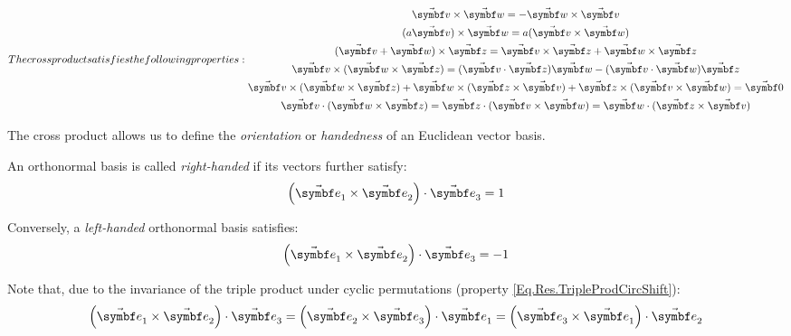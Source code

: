 \begin{subequations}
The cross product satisfies the following properties:
\begin{gather}
\vabs{v} \times \vabs{w} = -\vabs{w} \times \vabs{v} \label{Eq.Res.CrossProd.Anti} \\%
(a\vabs{v}) \times \vabs{w} = a(\vabs{v} \times \vabs{w}) \label{Eq.Res.CrossProd.ScalarLin} \\
(\vabs{v} + \vabs{w}) \times \vabs{z} = \vabs{v} \times \vabs{z} + \vabs{w} \times \vabs{z} \label{Eq.Res.CrossProd.Dist} \\
\vabs{v} \times (\vabs{w} \times \vabs{z}) = (\vabs{v} \cdot \vabs{z})\vabs{w} - (\vabs{v} \cdot \vabs{w})\vabs{z} \label{Eq.Res.CrossProd.Grassman} \\
\vabs{v} \times (\vabs{w} \times \vabs{z}) + \vabs{w} \times (\vabs{z} \times \vabs{v}) + \vabs{z} \times (\vabs{v} \times \vabs{w}) = \vabs{0} \label{Eq.Res.CrossProd.Jacobi} \\
\vabs{v} \cdot (\vabs{w} \times \vabs{z}) = \vabs{z} \cdot (\vabs{v} \times \vabs{w}) = \vabs{w} \cdot (\vabs{z} \times \vabs{v}) \label{Eq.Res.TripleProdCircShift}
\end{gather}
\end{subequations}

The cross product allows us to define the \emph{orientation} or \emph{handedness} of an Euclidean vector basis.

An orthonormal basis is called \emph{right-handed} if its vectors further satisfy:
\begin{equation} \label{Eq.Def.Basis.RightHanded}
\rndp{\vasub{\bv}{1} \times \vasub{\bv}{2}} \cdot \vasub{\bv}{3} =1
\end{equation}

Conversely, a \emph{left-handed} orthonormal basis satisfies:
\begin{equation} \label{Eq.Def.Basis.LeftHanded}
\rndp{\vasub{\bv}{1} \times \vasub{\bv}{2}} \cdot \vasub{\bv}{3} =-1
\end{equation}

Note that, due to the invariance of the triple product under cyclic permutations (property \eqref{Eq.Res.TripleProdCircShift}):
\begin{equation} \label{Eq.Res.Basis.Cyclic}
\rndp{\vasub{\bv}{1} \times \vasub{\bv}{2}} \cdot \vasub{\bv}{3} = \rndp{\vasub{\bv}{2} \times \vasub{\bv}{3}} \cdot \vasub{\bv}{1} = \rndp{\vasub{\bv}{3} \times \vasub{\bv}{1}} \cdot \vasub{\bv}{2}
\end{equation}

